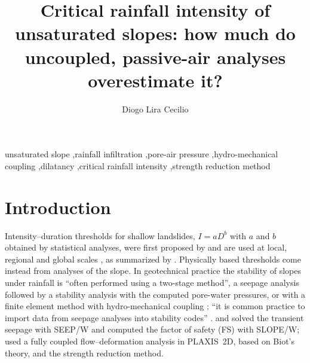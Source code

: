 \documentclass[preprint,12pt,authoryear]{elsarticle}
\begin{document}
\begin{frontmatter}

\title{Critical rainfall intensity of unsaturated slopes: how much do uncoupled, passive-air analyses overestimate
it?}

\author[ufpr]{Diogo Lira Cecilio}

\begin{abstract}

\end{abstract}

\begin{keyword}
unsaturated slope \sep rainfall infiltration \sep pore-air pressure \sep hydro-mechanical coupling \sep dilatancy
\sep critical rainfall intensity \sep strength reduction method
\end{keyword}
\end{frontmatter}

\section{Introduction}

Intensity--duration thresholds for shallow landslides, $I=aD^b$ with $a$ and $b$ obtained by statistical analyses,
were first proposed by \citet{caine1980} and are used at local, regional and global scales \citep{guzzetti2008}, as
summarized by \citet[p.~2913]{wang2021}. Physically based thresholds come instead from analyses of the slope. In
geotechnical practice the stability of slopes under rainfall is ``often performed using a two-stage method'', a seepage
analysis followed by a stability analysis with the computed pore-water pressures, or with a finite element method with
hydro-mechanical coupling \citep[p.~1]{liu2021}; ``it is common practice to import data from seepage analyses into
stability codes'' \citep[p.~791]{pedroso2015}. \citet[pp.~1534--1535]{rahardjo2007} and \citet[p.~324]{tang2018}
solved the transient seepage with SEEP/W and computed the factor of safety (FS) with SLOPE/W;
\citet[p.~4]{pradhan2022} used a fully coupled flow--deformation analysis in PLAXIS~2D, based on Biot's theory, and the
strength reduction method.
\end{document}
